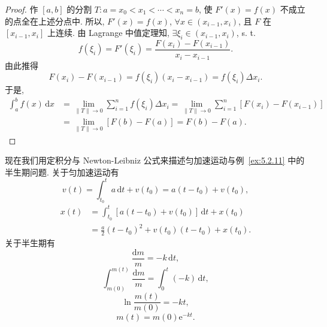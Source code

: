 \begin{proof}
作 $[a,b]$ 的分割 $T:a=x_{0}<x_{1}<\cdots<x_{n}=b$, 使 $F'(x)=f(x)$ 不成立的点全在上述分点中. 所以, $F'(x)=f(x)$, $\forall x\in(x_{i-1},x_{i})$, 且 $F$ 在 $[x_{i-1},x_{i}]$ 上连续. 由 Lagrange 中值定理知, $\exists\xi_{i}\in(x_{i-1},x_{i})$, s. t.
\[
f(\xi_{i})=F'(\xi_{i})=\frac{F(x_{i})-F(x_{i-1})}{x_{i}-x_{i-1}}.
\]
由此推得
\[
F(x_{i})-F(x_{i-1})=f(\xi_{i})(x_{i}-x_{i-1})=f(\xi_{i})\Delta x_{i}.
\]
于是,
\[
\begin{aligned}
\int_{a}^{b}f(x)\,\mathrm{d}x&=\lim_{\|T\|\to 0}\sum_{i=1}^{n}f(\xi_{i})\Delta x_{i}=\lim_{\|T\|\to 0}\sum_{i=1}^{n}[F(x_{i})-F(x_{i-1})]\\
&=\lim_{\|T\|\to 0}[F(b)-F(a)]=F(b)-F(a).
\end{aligned}
\]
\end{proof}

\begin{remark}\label{rem:6.3.1}
现在我们用定积分与 Newton-Leibniz 公式来描述匀加速运动与例~\ref{ex:5.2.11} 中的半生期问题. 关于匀加速运动有
\[
v(t)=\int_{t_{0}}^{t}a\,\mathrm{d}t+v(t_{0})=a(t-t_{0})+v(t_{0}),
\]
\[
\begin{aligned}
x(t)&=\int_{t_{0}}^{t}[a(t-t_{0})+v(t_{0})]\,\mathrm{d}t+x(t_{0})\\
&=\frac{a}{2}(t-t_{0})^{2}+v(t_{0})(t-t_{0})+x(t_{0}).
\end{aligned}
\]
关于半生期有
\[
\frac{\mathrm{d}m}{m}=-k\,\mathrm{d}t,
\]
\[
\int_{m(0)}^{m(t)}\frac{\mathrm{d}m}{m}=\int_{0}^{t}(-k)\,\mathrm{d}t,
\]
\[
\ln\frac{m(t)}{m(0)}=-kt,
\]
\[
m(t)=m(0)\mathrm{e}^{-kt}.
\]
\end{remark}

